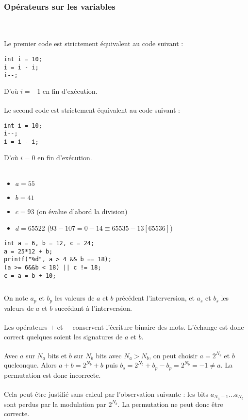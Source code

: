 \documentclass[../main.tex]{subfiles}
\begin{document}
\subsubsection{Opérateurs sur les variables}
\\ \\ 
Le premier code est strictement équivalent au code suivant :
\begin{verbatim}
int i = 10;
i = i - i;
i--;
\end{verbatim}
D'où $i = -1$ en fin d'exécution.\\ \\ 
Le second code est strictement équivalent au code suivant :
\begin{verbatim}
int i = 10;
i--;
i = i - i;
\end{verbatim}
D'où $i = 0$ en fin d'exécution.
\\ \\ 
\begin{itemize}
	\item $a = 55$
	\item $b = 41$
	\item $c = 93$ (on évalue d'abord la division)
	\item $d = 65522$ ($93 - 107 = 0 - 14 \equiv 65535 - 13 [65536]$)
\end{itemize}
\begin{verbatim}
int a = 6, b = 12, c = 24;
a = 25*12 + b;
printf("%d", a > 4 && b == 18);
(a >= 6&&b < 18) || c != 18;
c = a = b + 10;
\end{verbatim}
\inputminted{c}{solutions/inter_no_side_effect_1.c}
On note $a_{p}$ et $b_{p}$ les valeurs de $a$ et $b$ précédent l'interversion, et $a_{s}$ et $b_{s}$ les valeurs de $a$ et $b$ succédant à l'interversion. \\ \\ 
Les opérateurs $+$ et $-$ conservent l'écriture binaire des mots. L'échange est donc correct quelques soient les signatures de $a$ et $b$.\\ \\ 
Avec $a$ sur $N_{a}$ bits et $b$ sur $N_{b}$ bits avec $N_{a} > N_{b}$, on peut choisir $a = 2^{N_{b}}$ et $b$ quelconque. Alors $a + b = 2^{N_{b}}+b$ puis $b_{s} = 2^{N_{b}}+b_{p} - b_{p} = 2^{N_{b}} = -1 \neq{a}$. La permutation est donc incorrecte.
\\ \\ 
Cela peut être justifié sans calcul par l'observation suivante : les bits $a_{N_{a}-1}\dots a_{N_b}$ sont perdus par la modulation par $2^{N_{b}}$. La permutation ne peut donc être correcte.
\end{document}
